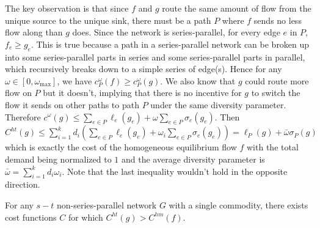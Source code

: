 \begin{proof-sketch}

    The key observation is that since $f$ and $g$ route the same amount of flow from the unique source to the unique sink, there must be a path $P$ where $f$ sends no less flow along than $g$ does. Since the network is series-parallel, for every edge $e$ in $P$, $f_e \ge g_e$. This is true because a path in a series-parallel network can be broken up into some series-parallel parts in series and some series-parallel parts in parallel, which recursively breaks down to a simple series of edge(s). Hence for any $\omega\in [0, \omega_{\max}]$, we have $c_P^\omega (f)\ge c_P^\omega(g)$. We also know that $g$ could route more flow on $P$ but it doesn't, implying that there is no incentive for $g$ to switch the flow it sends on other paths to path $P$ under the same diversity parameter. Therefore $c^\omega(g)\le \sum_{e\in P} \ell_e(g_e)+\omega\sum_{e\in P}\sigma_e(g_e)$. Then $C^{ht}(g)\le \sum_{i=1}^k d_i(\sum_{e\in P} \ell_e(g_e)+\omega_i\sum_{e\in P}\sigma_e(g_e))=\ell_P(g)+\bar{\omega}\sigma_P(g)$ which is exactly the cost of the homogeneous equilibrium flow $f$ with the total demand being normalized to $1$ and the average diversity parameter is $\bar{\omega}=\sum_{i=1}^k d_i\omega_i$. Note that the last inequality wouldn't hold in the opposite direction. %
\end{proof-sketch}


\begin{theorem}
For any $s-t$ non-series-parallel network $G$ with a single commodity, there exists cost functions $C$ for which $C^{ht}(g)> C^{hm}(f)$.
\label{diversethm2}
\end{theorem}

